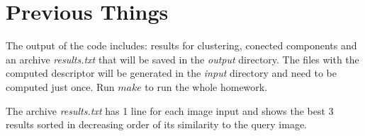 \section{Previous Things}

The output of the code includes: results for clustering, conected components and an archive \textit{results.txt} that will be saved in the \textit{output} directory. The files with the computed descriptor will be generated in the \textit{input} directory and need to be computed just once. Run $make$ to run the whole homework.

The archive \textit{results.txt} has 1 line for each image input and shows the best 3 results sorted in decreasing order of its similarity to the query image.

